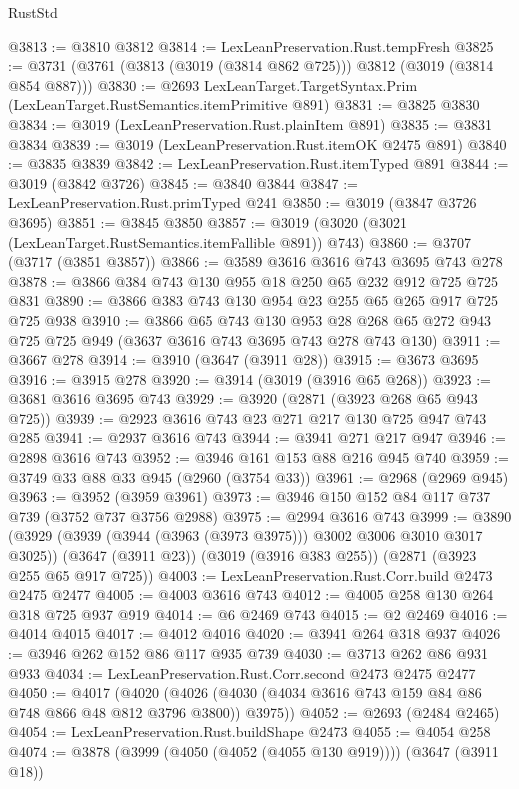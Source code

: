 \begin{lexlean}{RustStd}
\begin{coremodule}
@3813 := @3810 @3812
@3814 := LexLeanPreservation.Rust.tempFresh
@3825 := @3731 (@3761 (@3813 (@3019 (@3814 @862 @725))) @3812 (@3019 (@3814 @854 @887)))
@3830 := @2693 LexLeanTarget.TargetSyntax.Prim (LexLeanTarget.RustSemantics.itemPrimitive @891)
@3831 := @3825 @3830
@3834 := @3019 (LexLeanPreservation.Rust.plainItem @891)
@3835 := @3831 @3834
@3839 := @3019 (LexLeanPreservation.Rust.itemOK @2475 @891)
@3840 := @3835 @3839
@3842 := LexLeanPreservation.Rust.itemTyped @891
@3844 := @3019 (@3842 @3726)
@3845 := @3840 @3844
@3847 := LexLeanPreservation.Rust.primTyped @241
@3850 := @3019 (@3847 @3726 @3695)
@3851 := @3845 @3850
@3857 := @3019 (@3020 (@3021 (LexLeanTarget.RustSemantics.itemFallible @891)) @743)
@3860 := @3707 (@3717 (@3851 @3857))
@3866 := @3589 @3616 @3616 @743 @3695 @743 @278
@3878 := @3866 @384 @743 @130 @955 @18 @250 @65 @232 @912 @725 @725 @831
@3890 := @3866 @383 @743 @130 @954 @23 @255 @65 @265 @917 @725 @725 @938
@3910 := @3866
    @65
    @743
    @130
    @953
    @28
    @268
    @65
    @272
    @943
    @725
    @725
    @949
    (@3637 @3616 @743 @3695 @743 @278 @743 @130)
@3911 := @3667 @278
@3914 := @3910 (@3647 (@3911 @28))
@3915 := @3673 @3695
@3916 := @3915 @278
@3920 := @3914 (@3019 (@3916 @65 @268))
@3923 := @3681 @3616 @3695 @743
@3929 := @3920 (@2871 (@3923 @268 @65 @943 @725))
@3939 := @2923 @3616 @743 @23 @271 @217 @130 @725 @947 @743 @285
@3941 := @2937 @3616 @743
@3944 := @3941 @271 @217 @947
@3946 := @2898 @3616 @743
@3952 := @3946 @161 @153 @88 @216 @945 @740
@3959 := @3749 @33 @88 @33 @945 (@2960 (@3754 @33))
@3961 := @2968 (@2969 @945)
@3963 := @3952 (@3959 @3961)
@3973 := @3946 @150 @152 @84 @117 @737 @739 (@3752 @737 @3756 @2988)
@3975 := @2994 @3616 @743
@3999 := @3890
    (@3929 (@3939 (@3944 (@3963 (@3973 @3975))) @3002 @3006 @3010 @3017 @3025))
    (@3647 (@3911 @23))
    (@3019 (@3916 @383 @255))
    (@2871 (@3923 @255 @65 @917 @725))
@4003 := LexLeanPreservation.Rust.Corr.build @2473 @2475 @2477
@4005 := @4003 @3616 @743
@4012 := @4005 @258 @130 @264 @318 @725 @937 @919
@4014 := @6 @2469 @743
@4015 := @2 @2469
@4016 := @4014 @4015
@4017 := @4012 @4016
@4020 := @3941 @264 @318 @937
@4026 := @3946 @262 @152 @86 @117 @935 @739
@4030 := @3713 @262 @86 @931 @933
@4034 := LexLeanPreservation.Rust.Corr.second @2473 @2475 @2477
@4050 := @4017
    (@4020 (@4026 (@4030 (@4034 @3616 @743 @159 @84 @86 @748 @866 @48 @812 @3796 @3800)) @3975))
@4052 := @2693 (@2484 @2465)
@4054 := LexLeanPreservation.Rust.buildShape @2473
@4055 := @4054 @258
@4074 := @3878
    (@3999 (@4050 (@4052 (@4055 @130 @919))))
    (@3647 (@3911 @18))

\end{coremodule}
\end{lexlean}
